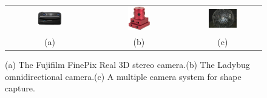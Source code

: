 \documentclass{report}
\begin{document}
\begin{savenotes}
\setlength{\tabcolsep}{4pt}
\begin{figure}
\centering
\begin{tabular}{ccc}
\includegraphics[trim=0.6in 0in 0.4in 0in, clip=true, width=0.3\textwidth]{images/fujifilm.eps}&
\includegraphics[width=0.27\textwidth]{images/ladybug.eps} & 
\includegraphics[width=0.4\textwidth]{images/uscSphere.eps} \\
(a) & (b) & (c)
\end{tabular}
\caption{(a) The Fujifilm FinePix Real 3D stereo camera.\protect\footnotemark[1] (b) The Ladybug omnidirectional camera.\protect\footnotemark[2] (c) A multiple camera system for shape capture.\protect\footnotemark[3]}
\label{productFig}
\end{figure}
\end{savenotes}
\end{document}
